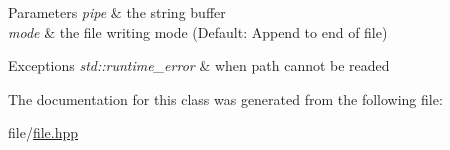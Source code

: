 \begin{DoxyParams}{Parameters}
{\em pipe} & the string buffer \\
\hline
{\em mode} & the file writing mode (Default\+: Append to end of file)\\
\hline
\end{DoxyParams}

\begin{DoxyExceptions}{Exceptions}
{\em std\+::runtime\+\_\+error} & when path cannot be readed \\
\hline
\end{DoxyExceptions}


The documentation for this class was generated from the following file\+:\begin{DoxyCompactItemize}
\item 
file/\hyperlink{file_8hpp}{file.\+hpp}\end{DoxyCompactItemize}

